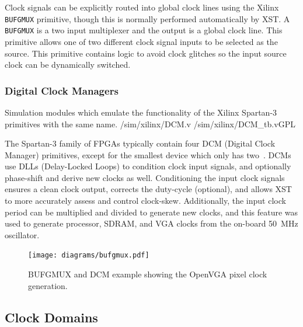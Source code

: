 Clock signals can be explicitly routed into global clock lines using the Xilinx
\texttt{BUFGMUX} primitive, though this is normally performed automatically by
XST. A \texttt{BUFGMUX} is a two input multiplexer and the output is a global
clock line. This primitive allows one of two different clock signal inputs to be
selected as the source. This primitive contains logic to avoid clock glitches so
the input source clock can be dynamically switched.


\subsubsection{Digital Clock Managers}
\label{CLOCK_DCM}

{Simulation modules which emulate the functionality of the Xilinx Spartan-3
primitives with the same name.} {/sim/xilinx/DCM.v} {/sim/xilinx/DCM\_tb.v}{GPL}

The Spartan-3 family of FPGAs typically contain four DCM (Digital Clock Manager)
primitives, except for the smallest device which only has
two~\cite{Xilinx_SP3_DS}. DCMs use DLLs (Delay-Locked Loops) to condition clock
input signals, and optionally phase-shift and derive new clocks as well.
Conditioning the input clock signals ensures a clean clock output, corrects the
duty-cycle (optional), and allows XST to more accurately assess and control
clock-skew. Additionally, the input clock period can be multiplied and divided to
generate new clocks, and this feature was used to generate processor, SDRAM, and
VGA clocks from the on-board 50~MHz oscillator.

\begin{figure}[h!]
\begin{center}
\texttt{[image: diagrams/bufgmux.pdf]}
\caption[OpenVGA pixel clock generation]{BUFGMUX and DCM example showing the
OpenVGA pixel clock generation.}
\label{CLOCK_BUFGMUX}
\end{center}
\end{figure}


\subsection{Clock Domains}


